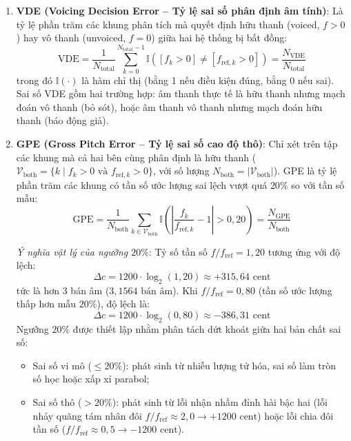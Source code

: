 \begin{enumerate}
    \item \textbf{VDE (Voicing Decision Error -- Tỷ lệ sai số phân định âm tính)}:
    Là tỷ lệ phần trăm các khung phân tích mà quyết định hữu thanh (voiced, $f > 0$) hay vô thanh (unvoiced, $f = 0$) giữa hai hệ thống bị bất đồng:
    \begin{equation}
        \text{VDE} = \frac{1}{N_{\text{total}}} \sum_{k=0}^{N_{\text{total}}-1} \mathbb{I}\left( [f_k > 0] \ne [f_{\text{ref}, k} > 0] \right) = \frac{N_{\text{VDE}}}{N_{\text{total}}}
        \label{eq:vde_def}
    \end{equation}
    trong đó $\mathbb{I}(\cdot)$ là hàm chỉ thị (bằng 1 nếu điều kiện đúng, bằng 0 nếu sai). Sai số VDE gồm hai trường hợp: âm thanh thực tế là hữu thanh nhưng mạch đoán vô thanh (bỏ sót), hoặc âm thanh vô thanh nhưng mạch đoán hữu thanh (báo động giả).

    \item \textbf{GPE (Gross Pitch Error -- Tỷ lệ sai số cao độ thô)}:
    Chỉ xét trên tập các khung mà cả hai bên cùng phân định là hữu thanh ($\mathcal{V}_{\text{both}} = \{k \mid f_k > 0 \text{ và } f_{\text{ref}, k} > 0\}$, với số lượng $N_{\text{both}} = |\mathcal{V}_{\text{both}}|$). GPE là tỷ lệ phần trăm các khung có tần số ước lượng sai lệch vượt quá $20\%$ so với tần số mẫu:
    \begin{equation}
        \text{GPE} = \frac{1}{N_{\text{both}}} \sum_{k \in \mathcal{V}_{\text{both}}} \mathbb{I}\left( \left| \frac{f_k}{f_{\text{ref}, k}} - 1 \right| > 0{,}20 \right) = \frac{N_{\text{GPE}}}{N_{\text{both}}}
        \label{eq:gpe_def}
    \end{equation}
    
    \emph{Ý nghĩa vật lý của ngưỡng $20\%$}: Tỷ số tần số $f / f_{\text{ref}} = 1{,}20$ tương ứng với độ lệch:
    \begin{equation}
        \Delta c = 1200 \cdot \log_2(1{,}20) \approx +315{,}64\text{ cent}
    \end{equation}
    tức là hơn 3 bán âm ($3{,}1564\text{ bán âm}$). Khi $f / f_{\text{ref}} = 0{,}80$ (tần số ước lượng thấp hơn mẫu $20\%$), độ lệch là:
    \begin{equation}
        \Delta c = 1200 \cdot \log_2(0{,}80) \approx -386{,}31\text{ cent}
    \end{equation}
    Ngưỡng $20\%$ được thiết lập nhằm phân tách dứt khoát giữa hai bản chất sai số:
    \begin{itemize}
        \item Sai số vi mô ($\le 20\%$): phát sinh từ nhiễu lượng tử hóa, sai số làm tròn số học hoặc xấp xỉ parabol;
        \item Sai số thô ($> 20\%$): phát sinh từ lỗi nhận nhầm đỉnh hài bậc hai (lỗi nhảy quãng tám nhân đôi $f / f_{\text{ref}} \approx 2{,}0 \to +1200\text{ cent}$) hoặc lỗi chia đôi tần số ($f / f_{\text{ref}} \approx 0{,}5 \to -1200\text{ cent}$).
    \end{itemize}


\end{enumerate}
